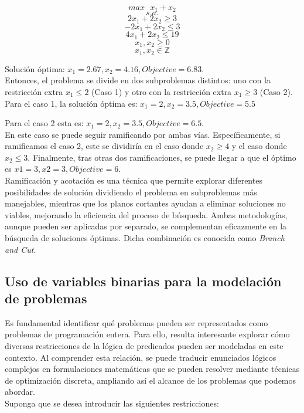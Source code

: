 \documentclass[12pt]{report}
\begin{document}
$$max \text{ } x_1 + x_2$$
$$s.a.$$
$$2x_1 + 2x_2 \geq  3$$
$$-2x_1 + 2x_2 \leq  3$$
$$4x_1 + 2x_2 \leq  19$$
$$x_1, x_2 \geq  0$$
$$x_1, x_2 \in \mathbb{Z}$$

Solución óptima: $x_1=2.67, x_2=4.16, Objective=6.83$.\\

Entonces, el problema se divide en dos subproblemas distintos: uno con la restricción extra $x_1\leq 2$ (Caso 1) y otro con la restricción extra $x_1\geq 3$ (Caso 2).\\

Para el caso 1, la solución óptima es: $x_1=2, x_2=3.5, Objective=5.5$

Para el caso 2 esta es: $x_1=2, x_2=3.5, Objective=6.5$.\\

En este caso se puede seguir ramificando por ambas vías. Específicamente, si ramificamos el caso 2, este se dividiría en el caso donde $x_2\geq 4$ y el caso donde $x_2\leq 3$. Finalmente, tras otras dos ramificaciones, se puede llegar a que el óptimo es $x1=3, x2=3, Objective=6$.\\

Ramificación y acotación es una técnica que permite explorar diferentes posibilidades de solución dividiendo el problema en subproblemas más manejables, mientras que los planos cortantes ayudan a eliminar soluciones no viables, mejorando la eficiencia del proceso de búsqueda. Ambas metodologías, aunque pueden ser aplicadas por separado, se complementan eficazmente en la búsqueda de soluciones óptimas. Dicha combinación es conocida como \textit{Branch and Cut}. 

\subsection{Uso de variables binarias para la modelación de problemas}


Es fundamental identificar qué problemas pueden ser representados como problemas de programación entera. Para ello, resulta interesante explorar cómo diversas restricciones de la lógica de predicados pueden ser modeladas en este contexto. Al comprender esta relación, se puede traducir enunciados lógicos complejos en formulaciones matemáticas que se pueden resolver mediante técnicas de optimización discreta, ampliando así el alcance de los problemas que podemos abordar.\\

Suponga que se desea introducir las siguientes restricciones:
\end{document}
